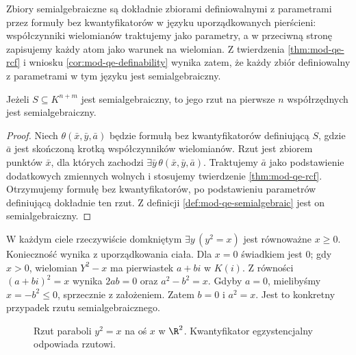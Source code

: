 Zbiory semialgebraiczne są dokładnie zbiorami
definiowalnymi z parametrami przez formuły bez
kwantyfikatorów w języku uporządkowanych pierścieni:
współczynniki wielomianów traktujemy jako parametry,
a w przeciwną stronę zapisujemy każdy atom jako
warunek na wielomian. Z twierdzenia \ref{thm:mod-qe-rcf}
i wniosku \ref{cor:mod-qe-definability} wynika zatem,
że każdy zbiór definiowalny z parametrami w tym języku
jest semialgebraiczny.

\begin{twierdzenie}
\label{thm:mod-qe-tarski-seidenberg}
Jeżeli $S\subseteq K^{n+m}$ jest semialgebraiczny,
to jego rzut na pierwsze $n$ współrzędnych jest
semialgebraiczny.
\end{twierdzenie}
\begin{proof}
Niech $\theta(\bar x,\bar y,\bar a)$ będzie formułą
bez kwantyfikatorów definiującą $S$, gdzie $\bar a$
jest skończoną krotką współczynników wielomianów.
Rzut jest zbiorem punktów $\bar x$, dla których
zachodzi $\exists\bar y\,\theta(\bar x,\bar y,\bar a)$.
Traktujemy $\bar a$ jako podstawienie dodatkowych
zmiennych wolnych i stosujemy twierdzenie
\ref{thm:mod-qe-rcf}. Otrzymujemy formułę bez
kwantyfikatorów, po podstawieniu parametrów
definiującą dokładnie ten rzut. Z definicji
\ref{def:mod-qe-semialgebraic} jest on semialgebraiczny.
\end{proof}

\begin{przyklad}
\label{ex:mod-qe-rcf-square}
W każdym ciele rzeczywiście domkniętym
$\exists y\,(y^2=x)$ jest równoważne $x\geq0$.
Konieczność wynika z uporządkowania ciała.
Dla $x=0$ świadkiem jest $0$; gdy $x>0$, wielomian
$Y^2-x$ ma pierwiastek $a+bi$ w $K(i)$.
Z równości $(a+bi)^2=x$ wynika
$2ab=0$ oraz $a^2-b^2=x$. Gdyby $a=0$, mielibyśmy
$x=-b^2\leq0$, sprzecznie z założeniem. Zatem $b=0$
i $a^2=x$. Jest to konkretny przypadek rzutu
semialgebraicznego.
\end{przyklad}

\begin{figure}[htbp]
\centering
{}
\caption{Rzut paraboli $y^2=x$ na oś $x$ w $\R^2$.
Kwantyfikator egzystencjalny odpowiada rzutowi.}
\label{fig:mod-qe-rcf-projection}
\end{figure}

